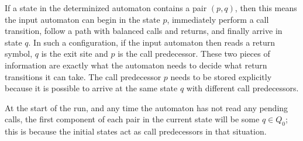 If a state in the determinized automaton contains a pair $(p,q)$, then this
means the input automaton can begin in the state $p$, immediately perform a call
transition, follow a path with balanced calls and returns, and finally arrive
in state $q$. In such a configuration, if the input automaton then reads a
return symbol, $q$ is the exit site and $p$ is the call predecessor. These
two pieces of information are exactly what the automaton needs to decide what
return transitions it can take. The call predecessor $p$ needs to be stored
explicitly because it is possible to arrive at the same state $q$ with
different call predecessors.

At the start of the run, and any time the automaton has not read any pending
calls, the first component of each pair in the current state will be some $q
\in Q_0$; this is because the initial states act as call predecessors in that
situation.

\newcommand{\WL}{\textit{WL}}

